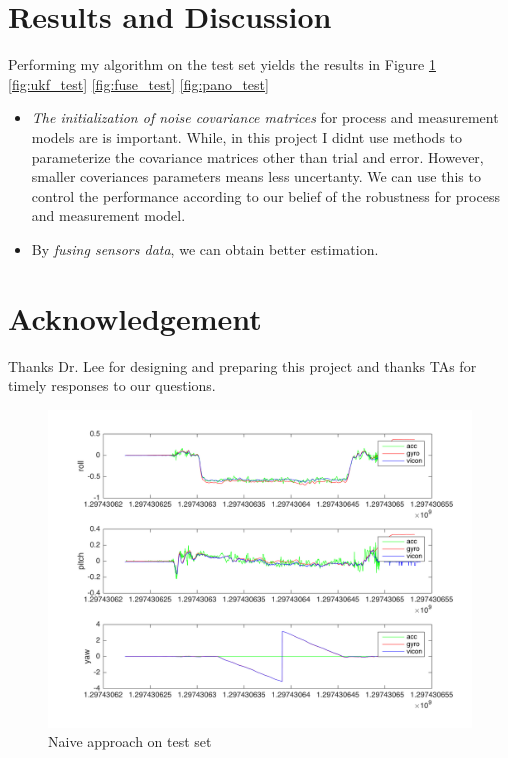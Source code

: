 \documentclass[english]{article}
\begin{document}
\section {Results and Discussion}
Performing my algorithm on the test set yields the results in Figure \ref{fig:naive_test} \ref{fig:ukf_test} \ref{fig:fuse_test} \ref{fig:pano_test} 
\begin{itemize}
\item \emph{The initialization of noise covariance matrices} for process and measurement models are is important. While, in this project I didnt use methods to parameterize the covariance matrices other than trial and error. However, smaller coveriances parameters means less uncertanty. We can use this to control the performance according to our belief of the robustness for process and measurement model.
\item By \emph{fusing sensors data}, we can obtain better estimation.
\end{itemize}

\section {Acknowledgement}
Thanks Dr. Lee for designing and preparing this project and thanks TAs for timely responses to our questions.
\begin{figure}
\centering
\includegraphics[scale=0.5]{images/naive_approach_100.png} 
\caption{Naive approach on test set}
\label{fig:naive_test}
\end{figure}
\end{document}

